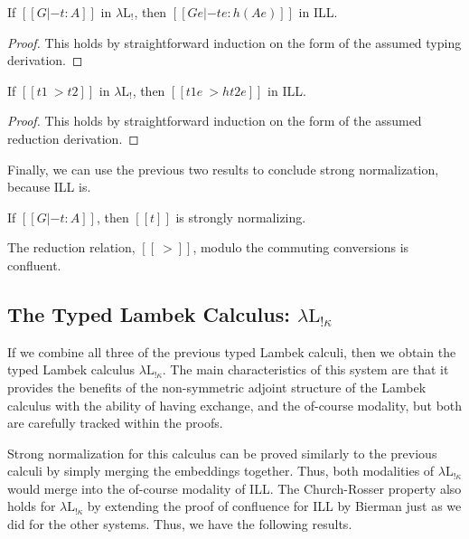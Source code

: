 \documentclass{lmcs}
\begin{document}
\begin{lem}
  \label{lemma:type_preserving_embedding_lambdaLk}
  If $[[G |- t : A]]$ in $\lambda\text{L}_!$, then
  $[[G e |- t e : h(A e)]]$ in ILL.
\end{lem}
\begin{proof}
  This holds by straightforward induction on the form of the assumed
  typing derivation.
\end{proof}
\begin{lem}
  \label{lemma:reduction_preserving_embedding_lambdaLk}
  If $[[t1 ~> t2]]$ in $\lambda\text{L}_!$, then $[[t1 e ~> h{t2 e}]]$
  in ILL.
\end{lem}
\begin{proof}
  This holds by straightforward induction on the form of the assumed
  reduction derivation.
\end{proof}
\noindent
Finally, we can use the previous two results to conclude strong
normalization, because ILL is.

\begin{thm}
  \label{corollary:strong_normalization_lambdaLk}
  If $[[G |- t : A]]$, then $[[t]]$ is strongly normalizing.
\end{thm}

\begin{thm}[Confluence]
  \label{thm:confluence-lambdaLk}
  The reduction relation, $[[~>]]$, modulo the commuting conversions
  is confluent.
\end{thm}

\subsection{The Typed Lambek Calculus: $\lambda\text{L}_{!\kappa}$}
\label{subsec:the_typed_lambek_calculus:lambda-l-!kappa}
If we combine all three of the previous typed Lambek calculi, then we
obtain the typed Lambek calculus $\lambda\text{L}_{!\kappa}$.  The
main characteristics of this system are that it provides the benefits
of the non-symmetric adjoint structure of the Lambek calculus with the
ability of having exchange, and the of-course modality, but both are
carefully tracked within the proofs.

Strong normalization for this calculus can be proved similarly to the
previous calculi by simply merging the embeddings together.  Thus,
both modalities of $\lambda\text{L}_{!\kappa}$ would merge into the
of-course modality of ILL.  The Church-Rosser property also holds for
$\lambda\text{L}_{!\kappa}$ by extending the proof of confluence for
ILL by Bierman \cite{Bierman:1994} just as we did for the other
systems.  Thus, we have the following results.
\end{document}
